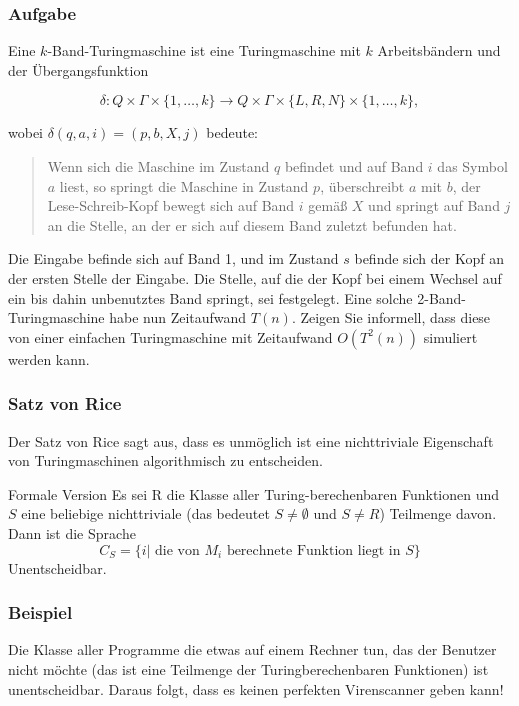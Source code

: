 \documentclass{beamer}
\begin{document}
\begin{frame}
\frametitle{Aufgabe}
\vspace{-1cm}
Eine $k$-Band-Turingmaschine ist eine Turingmaschine mit $k$
Arbeitsbändern und der Übergangsfunktion

\[ \delta: Q \times \Gamma \times \{1, \ldots, k\} \to
Q \times \Gamma \times \{L, R, N\} \times \{1, \ldots, k\}, \]

wobei $\delta(q, a, i) = (p, b, X, j)$ bedeute:

\begin{quote}
  Wenn sich die Maschine im Zustand $q$ befindet und
  auf Band $i$ das Symbol $a$ liest, so springt die Maschine in Zustand $p$,
  überschreibt $a$ mit $b$, der Lese-Schreib-Kopf bewegt sich auf Band $i$
  gemäß $X$ und springt auf Band $j$ an die Stelle, an der er sich
  auf diesem Band zuletzt befunden hat.
\end{quote}

Die Eingabe befinde sich auf Band 1, und im Zustand $s$ befinde sich der
Kopf an der ersten Stelle der Eingabe. Die Stelle, auf die der Kopf bei einem
Wechsel auf ein bis dahin unbenutztes Band springt, sei
festgelegt.
Eine solche 2-Band-Turingmaschine habe nun Zeitaufwand $T(n)$.
Zeigen Sie informell, dass diese von einer einfachen
Turingmaschine mit Zeitaufwand $O(T^2(n))$ simuliert werden kann.\\
\end{frame}

\begin{frame}
\frametitle{Satz von Rice}
Der Satz von Rice sagt aus, dass es unmöglich ist eine nichttriviale Eigenschaft von Turingmaschinen algorithmisch zu entscheiden.
\begin{block}{Formale Version}
Es sei R die Klasse aller Turing-berechenbaren Funktionen und $S$ eine beliebige nichttriviale (das bedeutet $S \neq \emptyset$ und $S \neq R$) Teilmenge davon. Dann ist die Sprache
$$ C_S = \{ i |\text{ die von $M_i$ berechnete Funktion liegt in $S$} \} $$
Unentscheidbar. 
\end{block}
\end{frame}
\begin{frame}
\frametitle{Beispiel}
Die Klasse aller Programme die etwas auf einem Rechner tun, das der Benutzer nicht möchte (das ist eine Teilmenge der Turingberechenbaren Funktionen) ist unentscheidbar. Daraus folgt, dass es keinen perfekten Virenscanner geben kann!
\end{frame}
\end{document}
